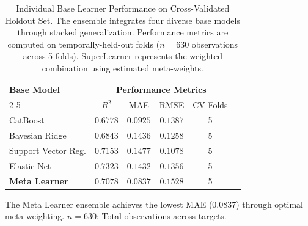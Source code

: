 
\begin{table}[!htbp]
\centering
\caption{%
    Individual Base Learner Performance on Cross-Validated Holdout Set.
    The ensemble integrates four diverse base models through stacked generalization.
    Performance metrics are computed on temporally-held-out folds ($n=630$ observations across 5 folds).
    SuperLearner represents the weighted combination using estimated meta-weights.
}
\label{tab:base_learners}
\small
\begin{tabular}{lccccc}
\toprule
\multirow{2}{*}{\textbf{Base Model}} & \multicolumn{4}{c}{\textbf{Performance Metrics}} \\
\cmidrule(lr){2-5}
& $R^2$ & MAE & RMSE & CV Folds \\
\midrule
CatBoost           & $0.6778$ & $0.0925$ & $0.1387$ & 5 \\
Bayesian Ridge     & $0.6843$ & $0.1436$ & $0.1258$ & 5 \\
Support Vector Reg. & $0.7153$ & $0.1477$ & $0.1078$ & 5 \\
Elastic Net        & $0.7323$ & $0.1432$ & $0.1356$ & 5 \\
\midrule
\textbf{Meta Learner} & $\mathbf{0.7078}$ & $\mathbf{0.0837}$ & $\mathbf{0.1528}$ & 5 \\
\bottomrule
\end{tabular}
\begin{flushleft}
\footnotesize
The Meta Learner ensemble achieves the lowest MAE ($0.0837$) through optimal meta-weighting.
$n=630$: Total observations across targets.
\end{flushleft}
\end{table}


